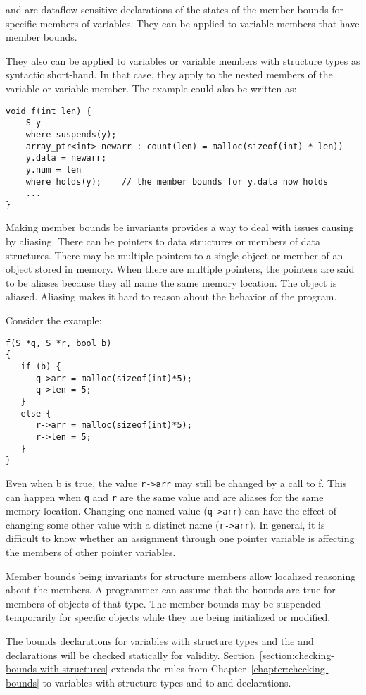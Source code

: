  and  are dataflow-sensitive declarations of 
the states of the member bounds for specific members of variables. They can be
applied to variable members that have member bounds.

They also can be applied to variables or variable members with structure
types as syntactic short-hand. In that case, they apply to the nested
members of the variable or variable member. The example could also be
written as:

\begin{verbatim}
void f(int len) {
    S y 
    where suspends(y);
    array_ptr<int> newarr : count(len) = malloc(sizeof(int) * len))
    y.data = newarr;
    y.num = len
    where holds(y);    // the member bounds for y.data now holds
    ...
}
\end{verbatim}

Making member bounds be invariants provides a way to deal with issues
causing by aliasing. There can be pointers to data structures or members
of data structures. There may be multiple pointers to a single object or
member of an object stored in memory. When there are multiple pointers,
the pointers are said to be aliases because they all name the same
memory location. The object is aliased. Aliasing makes it hard to reason
about the behavior of the program.

Consider the example:
\begin{verbatim}
f(S *q, S *r, bool b)
{
   if (b) {
      q->arr = malloc(sizeof(int)*5);
      q->len = 5;
   }
   else {
      r->arr = malloc(sizeof(int)*5);
      r->len = 5;
   }
}
\end{verbatim}

Even when b is true, the value \texttt{r->arr} may still be
changed by a call to f. This can happen when \texttt{q} and \texttt{r}
are the same value and are aliases for the same memory location.
Changing one named value (\texttt{q->arr}) can have the
effect of changing some other value with a distinct name
(\texttt{r->arr}). In general, it is difficult to know
whether an assignment through one pointer variable is affecting the
members of other pointer variables.

Member bounds being invariants for structure members allow localized
reasoning about the members. A programmer can assume that the bounds are true
for members of objects of that type. The member bounds may be suspended temporarily
for specific objects while they are being initialized or modified.

The bounds declarations for variables with structure types and the
 and  declarations will be checked statically 
for validity.  Section~\ref{section:checking-bounds-with-structures} extends 
the rules  from Chapter~\ref{chapter:checking-bounds} to variables with structure
types and to  and  declarations.


